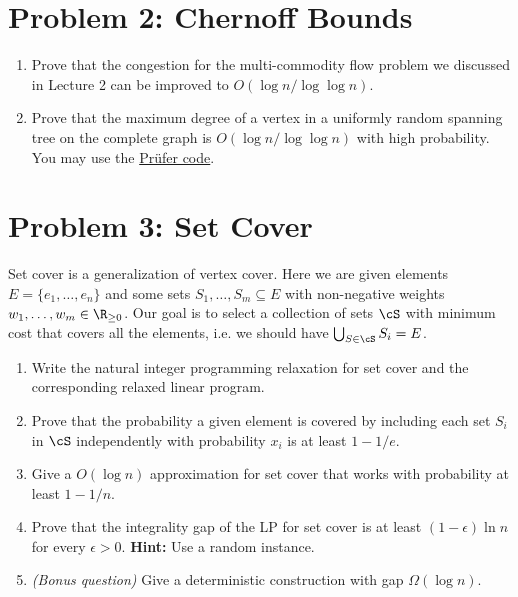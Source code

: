 \section{Problem 2: Chernoff Bounds}

\begin{enumerate}
\item Prove that the congestion for the multi-commodity flow problem we discussed in Lecture 2 can be improved to $O(\log n/\log \log n)$. 
\item Prove that the maximum degree of a vertex in a uniformly random spanning tree on the complete graph is $O(\log n/\log \log n)$ with high probability. You may use the \href{https://en.wikipedia.org/wiki/Pr\%C3\%BCfer_sequence}{Prüfer code}. 
\end{enumerate}

\section{Problem 3: Set Cover}

Set cover is a generalization of vertex cover. Here we are given elements $E = \{e_1,\dots,e_n\}$ and some sets $S_1,\dots,S_m \subseteq E$ with non-negative weights $w_1,\dots,w_m \in \R_{\ge 0}$. Our goal is to select a collection of sets $\cS$ with minimum cost that covers all the elements, i.e. we should have $\bigcup_{S \in \cS} S_i = E$.
\begin{enumerate}
\item Write the natural integer programming relaxation for set cover and the corresponding relaxed linear program. 
\item Prove that the probability a given element is covered by including each set $S_i$ in $\cS$ independently with probability $x_{i}$ is at least $1-1/e$. 
\item Give a $O(\log n)$ approximation for set cover that works with probability at least $1-1/n$. 
\item Prove that the integrality gap of the LP for set cover is at least $(1-\epsilon)\ln n$ for every $\epsilon > 0$. \textbf{Hint:} Use a random instance. 

\item \textit{(Bonus question)} Give a deterministic construction with gap $\Omega(\log n)$. 
\end{enumerate}


